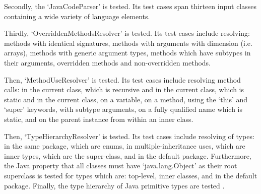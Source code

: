 \documentclass[12pt, letterpaper]{article}
\begin{document}
Secondly, the `JavaCodeParser' is tested.
Its test cases span thirteen input classes containing a wide variety of language elements.

Thirdly, `OverriddenMethodsResolver' is tested.
Its test cases include resolving: methods with identical signatures, methods with arguments with dimension (i.e. arrays), methods with generic argument types, methods which have subtypes in their arguments, overridden methods and non-overridden methods.

Then, `MethodUseResolver' is tested.
Its test cases include resolving method calls: in the current class, which is recursive and in the current class, which is static and in the current class, on a variable, on a method, using the `this' and `super' keywords, with subtype arguments, on a fully qualified name which is static, and on the parent instance from within an inner class.

Then, `TypeHierarchyResolver' is tested.
Its test cases include resolving of types: in the same package, which are enums, in multiple-inheritance uses, which are inner types, which are the super-class, and in the default package.
Furthermore, the Java property that all classes must have `java.lang.Object' as their root superclass is tested for types which are: top-level, inner classes, and in the default package.
Finally, the type hierarchy of Java primitive types are tested \autocite{javadocsnumber}.
\end{document}
